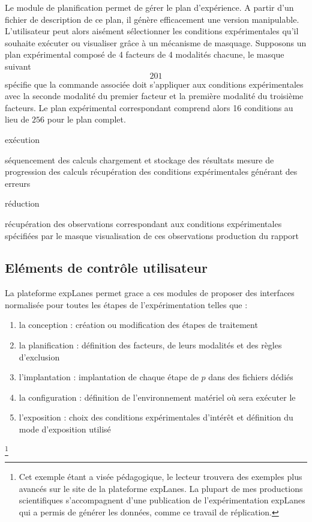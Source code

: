 Le module de planification permet de gérer le plan d'expérience. A partir d'un fichier de description de ce plan, il génère efficacement une version manipulable. L'utilisateur peut alors aisément sélectionner les conditions expérimentales qu'il souhaite exécuter ou visualiser grâce à un mécanisme de masquage. Supposons un plan expérimental composé de 4 facteurs de 4 modalités chacune, le masque suivant $${2 0 1}$$ spécifie que la commande associée doit s'appliquer aux conditions expérimentales avec la seconde modalité du premier facteur et la première modalité du troisième facteurs. Le plan expérimental correspondant comprend alors 16 conditions au lieu de  $256$ pour le plan complet.

exécution

séquencement des calculs
chargement et stockage des résultats
mesure de progression des calculs
récupération des conditions expérimentales générant des erreurs

réduction

récupération des observations correspondant aux conditions expérimentales spécifiées par le masque
visualisation de ces observations
production du rapport


\subsection{Eléments de contrôle utilisateur}

La plateforme expLanes permet grace a ces modules de proposer des interfaces normalisée pour toutes les étapes de l'expérimentation telles que :

\begin{enumerate}
  \item la conception : création ou modification des étapes de traitement
  \item la planification : définition des facteurs, de leurs modalités et des règles d'exclusion
  \item l'implantation : implantation de chaque étape de $p$ dans des fichiers dédiés
  \item la configuration : définition de l'environnement matériel où sera exécuter le
  \item l'exposition : choix des conditions expérimentales d'intérêt et définition du mode d'exposition utilisé
\end{enumerate}



\footnote{Cet exemple étant a visée pédagogique, le lecteur trouvera des exemples plus avancés sur le site de la plateforme expLanes. La plupart de mes productions scientifiques s'accompagnent d'une publication de l'expérimentation expLanes qui a permis de générer les données, comme ce travail de réplication\cite{lagrange2015}.}

